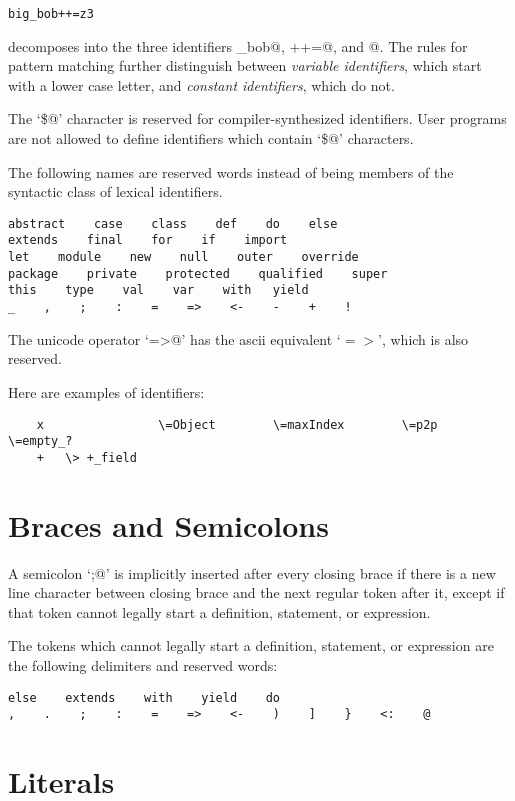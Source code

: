 \documentclass[11pt]{report}
\begin{document}
\begin{verbatim}
big_bob++=z3
\end{verbatim}

decomposes into the three identifiers \verb@big_bob@, \verb@++=@, and
@.  The rules for pattern matching further distinguish between
{\em variable identifiers}, which start with a lower case letter, and
{\em constant identifiers}, which do not.


The `\verb@\$@' character is reserved for compiler-synthesized identifiers.
User programs are not allowed to define identifiers which contain `\verb@\$@'
characters.

The following names are reserved words instead of being members of the
syntactic class \verb@id@ of lexical identifiers.

\begin{verbatim}
abstract    case    class    def    do    else
extends    final    for    if    import
let    module    new    null    outer    override
package    private    protected    qualified    super
this    type    val    var    with   yield
_    ,    ;    :    =    =>    <-    -    +    !
\end{verbatim}

The unicode operator `\verb@=>@' has the ascii equivalent
`$=>$', which is also reserved.

\example
Here are examples of identifiers:
\begin{verbatim}
    x                \=Object        \=maxIndex        \=p2p             \=empty_?
    +   \> +_field
\end{verbatim}

\section{Braces and Semicolons}

A semicolon `\verb@;@' is implicitly inserted after every closing brace
if there is a new line character between closing brace and the next
regular token after it, except if that token cannot legally start a
definition, statement, or expression.

The tokens which cannot legally start a definition, statement, or expression
are the following delimiters and reserved words:
\begin{verbatim}
else    extends    with    yield    do
,    .    ;    :    =    =>    <-    )    ]    }    <:    @
\end{verbatim}

\section{Literals}
\end{document}
